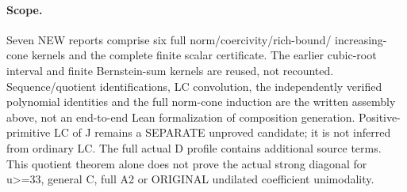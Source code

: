 \paragraph{Scope.}
Seven NEW reports comprise six full norm/coercivity/rich-bound/
increasing-cone kernels and the complete finite scalar certificate.
The earlier cubic-root interval and finite Bernstein-sum kernels
are reused, not recounted. Sequence/quotient identifications,
LC convolution, the independently verified polynomial identities
and the full norm-cone induction are the written assembly above,
not an end-to-end Lean formalization of composition generation.
Positive-primitive LC of J remains a SEPARATE unproved candidate;
it is not inferred from ordinary LC. The full actual D profile
contains additional source terms. This quotient theorem alone
does not prove the actual strong diagonal for u>=33, general C,
full A2 or ORIGINAL undilated coefficient unimodality.
